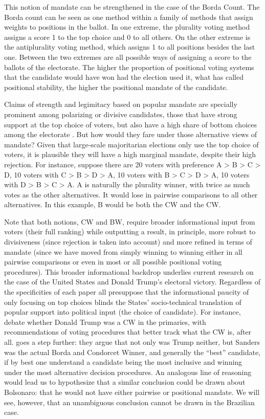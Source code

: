 \documentclass[hidelinks,11pt]{article}
\begin{document}
This notion of mandate can be strengthened in the case of the Borda Count. The
Borda count can be seen as one method within a family of methods that assign
weights to positions in the ballot. In one extreme, the plurality voting method
assigns a score 1 to the top choice and 0 to all others. On the other extreme is
the antiplurality voting method, which assigns 1 to all positions besides the
last one. Between the two extremes are all possible ways of assigning a score to
the ballots of the electorate. The higher the proportion of positional voting
systems that the candidate would have won had the election used it, what
\textcite{tabarrok2001president} has called positional stability, the higher the
positional mandate of the candidate.

Claims of strength and legimitacy based on popular mandate are specially
prominent among polarizing or divisive candidates, those that have strong
support at the top choice of voters, but also have a high share of bottom
choices among the electorate \parencite{igersheim22_compar_votin_method}. But
how would they fare under those alternative views of mandate? Given
that large-scale majoritarian elections only use the top choice of voters, it is
plausible they will have a high marginal mandate, despite their high rejection.
For instance, suppose there are 20 voters with preference A > B > C > D, 10
voters with C > B > D > A, 10 voters with B > C > D > A, 10 voters with D > B >
C > A. A is naturally the plurality winner, with twice as much votes as the
other alternatives. It would lose in pairwise comparisons to all other
alternatives. In this example, B would be both the CW and the CW.

Note that both notions, CW and BW, require broader informational input from
voters (their full ranking) while outputting a result, in principle, more robust
to divisiveness (since rejection is taken into account) and more refined in
terms of mandate (since we have moved from simply winning to winning either in
all pairwise comparisons or even in most or all possible positional voting
procedures). This broader informational backdrop underlies current research on
the case of the United States and Donald Trump's electoral victory. Regardless
of the specificities of each paper all presuppose that the informational paucity
of only focusing on top choices blinds the States' socio-technical translation
of popular support into political input (the choice of candidate). For instance,
\textcite{potthoff2021condorcet, woon2020trump, kurrild2018trump} debate whether
Donald Trump was a CW in the primaries, with recommendations of voting
procedures that better track what the CW is, after all.
\textcite{igersheim22_compar_votin_method} goes a step further: they argue that
not only was Trump neither, but Sanders was the actual Borda and Condorcet
Winner, and generally the ``best'' candidate, if by best one understand a
candidate being the most inclusive and winning under the most alternative
decision procedures. An analogous line of reasoning would lead us to hypothesize
that a similar conclusion could be drawn about Bolsonaro: that he would not have
either pairwise or positional mandate. We will see, however, that an unambiguous
conclusion cannot be drawn in the Brazilian case.
\end{document}
